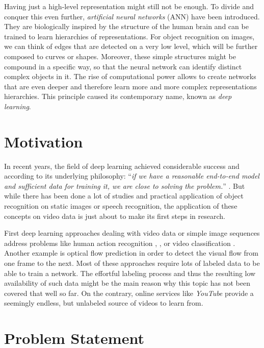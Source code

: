 Having just a high-level representation might still not be enough. To divide and conquer this even further, \textit{artificial neural networks} (ANN) have been introduced. They are biologically inspired by the structure of the human brain \parencite{ann} and can be trained to learn hierarchies of representations. For object recognition on images, we can think of edges that are detected on a very low level, which will be further composed to curves or shapes. Moreover, these simple structures might be compound in a specific way, so that the neural network can identify distinct complex objects in it. The rise of computational power allows to create networks that are even deeper and therefore learn more and more complex representations hierarchies. This principle caused its contemporary name, known as \textit{deep learning}.

\section{Motivation}

In recent years, the field of deep learning achieved considerable success and according to its underlying philosophy: ``\textit{if we have a reasonable end-to-end model and sufficient data for training it, we are close to solving the problem.}'' \parencite{conv_lstm_nowcasting}. But while there has been done a lot of studies and practical application of object recognition on static images or speech recognition, the application of these concepts on video data is just about to make its first steps in research. 

First deep learning approaches dealing with video data or simple image sequences address problems like human action recognition \parencite{conv3d_action_class}, \parencite{two_stream_action}, \parencite{longterm_rec_recog} or video classification \parencite{large_video_class}. Another example is optical flow prediction \parencite{flownet} in order to detect the visual flow from one frame to the next. Most of these approaches require lots of labeled data to be able to train a network. The effortful labeling process and thus the resulting low availability of such data might be the main reason why this topic has not been covered that well so far. On the contrary, online services like \textit{YouTube} provide a seemingly endless, but unlabeled source of videos to learn from.


\section{Problem Statement}

